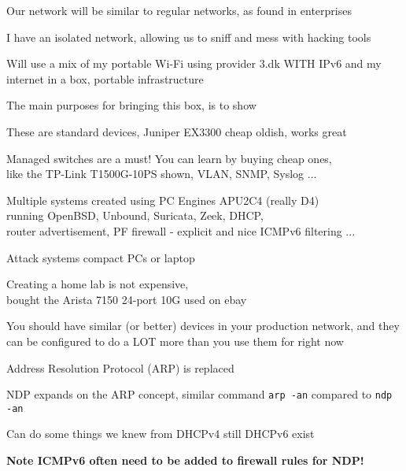 \documentclass[Screen16to9,17pt]{foils}
\begin{document}


\begin{list1}
\item Our network will be similar to regular networks, as found in enterprises
\item I have an isolated network, allowing us to sniff and mess with hacking tools
\item Will use a mix of my portable Wi-Fi using provider 3.dk WITH IPv6 and my internet in a box, portable infrastructure
\end{list1}



The main purposes for bringing this box, is to show
\begin{list2}
\item These are standard devices, Juniper EX3300 cheap oldish, works great
\item Managed switches are a must! You can learn by buying cheap ones,\\
like the TP-Link T1500G-10PS  shown, VLAN, SNMP, Syslog ...
\item Multiple systems created using PC Engines APU2C4 (really D4)\\
running OpenBSD, Unbound, Suricata, Zeek, DHCP, \\
router advertisement, PF firewall - explicit and nice ICMPv6 filtering ...
\item Attack systems compact PCs or laptop
\item Creating a home lab is not expensive, \\
bought the Arista 7150 24-port 10G used on ebay
\end{list2}

You should have similar (or better) devices in your production network, and they can be
configured to do a LOT more than you use them for right now




\begin{list1}
\item Address Resolution Protocol (ARP) is replaced
\item NDP expands on the ARP concept, similar command \verb+arp -an+ compared to \verb+ndp -an+
\item Can do some things we knew from DHCPv4 still DHCPv6 exist
\item {\bf Note ICMPv6 often need to be added to firewall rules for NDP!} {\myalert}
\end{list1}
\end{document}
